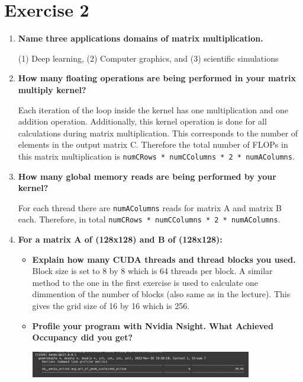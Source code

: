 \documentclass[a4paper,11pt]{scrartcl}
\begin{document}
\section*{Exercise 2}

\begin{enumerate}
\item \textbf{Name three applications domains of matrix multiplication.}

(1) Deep learning, (2) Computer graphics, and (3) scientific simulations

\item \textbf{How many floating operations are being performed in your matrix multiply kernel? }

Each iteration of the loop inside the kernel has one multiplication and one addition operation. Additionally, this kernel operation is done for all calculations during matrix multiplication. This corresponds to the number of elements in the output matrix C. Therefore the total number of FLOPs in this matrix multiplication is \verb|numCRows * numCColumns * 2 * numAColumns|.

\item \textbf{How many global memory reads are being performed by your kernel?  }

For each thread there are \verb|numAColumns| reads for matrix A and matrix B each. Therefore, in total \verb|numCRows * numCColumns * 2 * numAColumns|.

\item \textbf{For a matrix A of (128x128) and B of (128x128):}
\begin{itemize}
    \item \textbf{Explain how many CUDA threads and thread blocks you used. }
    Block size is set to 8 by 8 which is 64 threads per block. A similar method to the one in the first exercise is used to calculate one dimmention of the number of blocks (also same as in the lecture). This gives the grid size of 16 by 16 which is 256.

    \item \textbf{Profile your program with Nvidia Nsight. What Achieved Occupancy did you get? }

    \includegraphics*[width=0.8\textwidth]{images/ach_occ3.png}
\end{itemize}


\end{enumerate}
\end{document}
